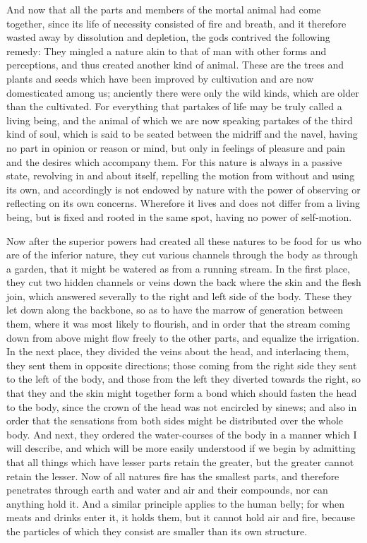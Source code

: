 And now that all the parts and members of the mortal animal had come
together, since its life of necessity consisted of fire and breath, and it
therefore wasted away by dissolution and depletion, the gods contrived the
following remedy: They mingled a nature akin to that of man with other
forms and perceptions, and thus created another kind of animal. These are
the trees and plants and seeds which have been improved by cultivation and
are now domesticated among us; anciently there were only the wild kinds,
which are older than the cultivated. For everything that partakes of life
may be truly called a living being, and the animal of which we are now
speaking partakes of the third kind of soul, which is said to be seated
between the midriff and the navel, having no part in opinion or reason or
mind, but only in feelings of pleasure and pain and the desires which
accompany them. For this nature is always in a passive state, revolving in
and about itself, repelling the motion from without and using its own, and
accordingly is not endowed by nature with the power of observing or
reflecting on its own concerns. Wherefore it lives and does not differ
from a living being, but is fixed and rooted in the same spot, having no
power of self-motion.

Now after the superior powers had created all these natures to be food for
us who are of the inferior nature, they cut various channels through the
body as through a garden, that it might be watered as from a running
stream. In the first place, they cut two hidden channels or veins down the
back where the skin and the flesh join, which answered severally to the
right and left side of the body. These they let down along the backbone,
so as to have the marrow of generation between them, where it was most
likely to flourish, and in order that the stream coming down from above
might flow freely to the other parts, and equalize the irrigation. In the
next place, they divided the veins about the head, and interlacing them,
they sent them in opposite directions; those coming from the right side
they sent to the left of the body, and those from the left they diverted
towards the right, so that they and the skin might together form a bond
which should fasten the head to the body, since the crown of the head was
not encircled by sinews; and also in order that the sensations from both
sides might be distributed over the whole body. And next, they ordered the
water-courses of the body in a manner which I will describe, and which
will be more easily understood if we begin by admitting that all things
which have lesser parts retain the greater, but the greater cannot retain
the lesser. Now of all natures fire has the smallest parts, and therefore
penetrates through earth and water and air and their compounds, nor can
anything hold it. And a similar principle applies to the human belly; for
when meats and drinks enter it, it holds them, but it cannot hold air and
fire, because the particles of which they consist are smaller than its own
structure.

